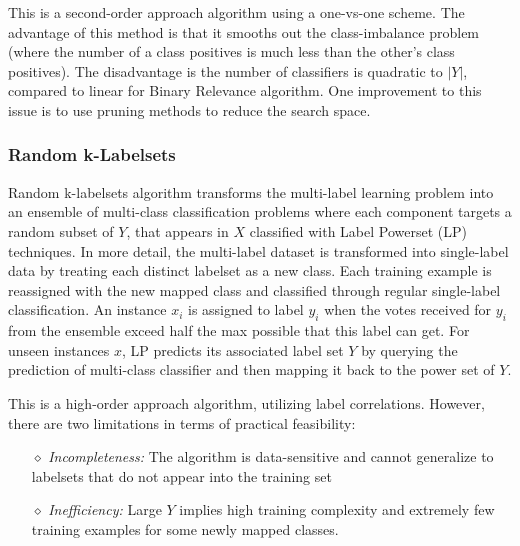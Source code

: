 \documentclass[12pt]{report}
\begin{document}
	This is a second-order approach algorithm using a one-vs-one scheme. The advantage of this method is that it smooths out the class-imbalance problem (where the number of a class positives is much less than the other's class positives). The disadvantage is the number of classifiers is quadratic to $|Y|$, compared to linear for Binary Relevance algorithm. One improvement to this issue is to use pruning methods to reduce the search space.
	
	\subsubsection*{Random k-Labelsets}
	Random k-labelsets algorithm transforms the multi-label learning problem into an ensemble of multi-class classification problems where each component targets a random subset of $Y$, that appears in $X$ classified with Label Powerset (LP) techniques. In more detail, the multi-label dataset is transformed into single-label data by treating each distinct labelset as a new class. Each training example is reassigned with the new mapped class and classified through regular single-label classification. An instance $x_i$ is assigned to label $y_i$ when the votes received for $y_i$ from the ensemble exceed half the max possible that this label can get. For unseen instances $x$, LP predicts its associated label set $Y$ by querying the prediction of multi-class classifier and then mapping it back to the power set of $Y$.
	
	This is a high-order approach algorithm, utilizing label correlations. However, there are two limitations in terms of practical feasibility: 
	
	\begin{itemize}
		\item[$\diamond$] \emph{Incompleteness: }The algorithm is data-sensitive and cannot generalize to labelsets that do not appear into the training set
		\item[$\diamond$] \emph{Inefficiency: }Large $Y$ implies high training complexity and extremely few training examples for some newly mapped classes.
	\end{itemize}
\end{document}
